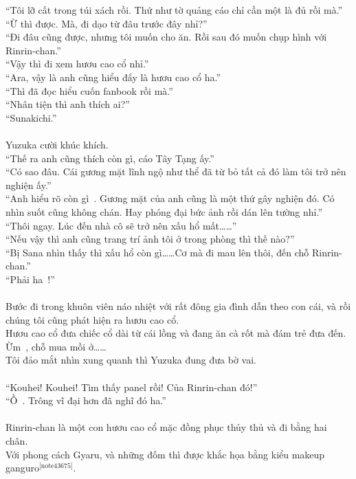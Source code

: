 \documentclass[12pt,a4paper, twosides]{book}
\begin{document}
“Tôi lỡ cất trong túi xách rồi. Thứ như tờ quảng cáo chỉ cần một là đủ rồi mà.”\\
“Ừ thì được. Mà, đi dạo từ đâu trước đây nhỉ?”\\
“Đi đâu cũng được, nhưng tôi muốn cho ăn. Rồi sau đó muốn chụp hình với Rinrin-chan.”\\
“Vậy thì đi xem hươu cao cổ nhỉ.”\\
“Ara, vậy là anh cũng hiểu đấy là hươu cao cổ ha.”\\
“Thì đã đọc hiểu cuốn fanbook rồi mà.”\\
“Nhân tiện thì anh thích ai?”\\
“Sunakichi.”\\
\\
Yuzuka cười khúc khích.\\
“Thế ra anh cũng thích còn gì, cáo Tây Tạng ấy.”\\
“Có sao đâu. Cái gương mặt lĩnh ngộ như thể đã từ bỏ tất cả đó làm tôi trở nên nghiện ấy.”\\
“Anh hiểu rõ còn gì~. Gương mặt của anh cũng là một thứ gây nghiện đó. Có nhìn suốt cũng không chán. Hay phóng đại bức ảnh rồi dán lên tường nhỉ.”\\
“Thôi ngay. Lúc đến nhà cô sẽ trở nên xấu hổ mất……”\\
“Nếu vậy thì anh cũng trang trí ảnh tôi ở trong phòng thì thế nào?”\\
“Bị Sana nhìn thấy thì xấu hổ còn gì……Cơ mà đi mau lên thôi, đến chỗ Rinrin-chan.”\\
“Phải ha~!”\\
\\
Bước đi trong khuôn viên náo nhiệt với rất đông gia đình dẫn theo con cái, và rồi chúng tôi cũng phát hiện ra hươu cao cổ.\\
Hươu cao cổ đưa chiếc cổ dài từ cái lồng và đang ăn cà rốt mà đám trẻ đưa đến.\\
Ừm~, chỗ mua mồi ở……\\
Tôi đảo mắt nhìn xung quanh thì Yuzuka đung đưa bờ vai.\\
\\
“Kouhei! Kouhei! Tìm thấy panel rồi! Của Rinrin-chan đó!”\\
“Ồ~. Trông vĩ đại hơn đã nghĩ đó ha.”\\
\\
Rinrin-chan là một con hươu cao cổ mặc đồng phục thủy thủ và đi bằng hai chân.\\
Với phong cách Gyaru, và những đốm thì được khắc họa bằng kiểu makeup ganguro$^\text{[note43675]}$.\\
\end{document}

